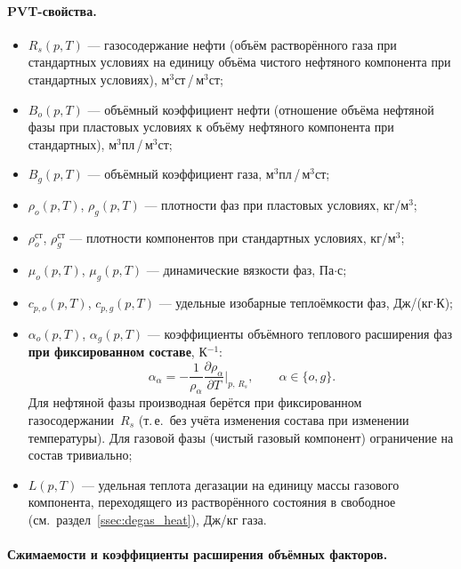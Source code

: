 \documentclass[12pt,a4paper]{article}
\begin{document}
\paragraph{PVT-свойства.}
\begin{itemize}[nosep]
  \item $R_s(p,T)$ --- газосодержание нефти (объём растворённого газа при
        стандартных условиях на единицу объёма чистого нефтяного компонента при стандартных условиях),
        м$^3$ст\,/\,м$^3$ст;
  \item $B_o(p,T)$ --- объёмный коэффициент нефти (отношение объёма
        нефтяной фазы при пластовых условиях к объёму нефтяного компонента
        при стандартных), м$^3$пл\,/\,м$^3$ст;
  \item $B_g(p,T)$ --- объёмный коэффициент газа, м$^3$пл\,/\,м$^3$ст;
  \item $\rho_o(p,T)$, $\rho_g(p,T)$ --- плотности фаз при пластовых
        условиях, кг/м$^3$;
  \item $\rho_o^{\text{ст}}$, $\rho_g^{\text{ст}}$ --- плотности
        компонентов при стандартных условиях, кг/м$^3$;
  \item $\mu_o(p,T)$, $\mu_g(p,T)$ --- динамические вязкости фаз, Па$\cdot$с;
  \item $c_{p,o}(p,T)$, $c_{p,g}(p,T)$ --- удельные изобарные теплоёмкости
        фаз, Дж/(кг$\cdot$К);
  \item $\alpha_o(p,T)$, $\alpha_g(p,T)$ --- коэффициенты объёмного
        теплового расширения фаз \textbf{при фиксированном составе},
        К$^{-1}$:
        \begin{equation}\label{eq:thermal_expansion}
          \alpha_\alpha = -\frac{1}{\rho_\alpha}
            \frac{\partial\rho_\alpha}{\partial T}\bigg|_{p,\,R_s},
            \qquad \alpha \in \{o, g\}.
        \end{equation}
        Для нефтяной фазы производная берётся при фиксированном
        газосодержании~$R_s$ (т.\,е.\ без учёта изменения состава при
        изменении температуры). Для газовой фазы (чистый газовый
        компонент) ограничение на состав тривиально;
  \item $L(p,T)$ --- удельная теплота дегазации на единицу массы
        газового компонента, переходящего из растворённого состояния
        в свободное (см.~раздел~\ref{ssec:degas_heat}), Дж/кг газа.
\end{itemize}

\paragraph{Сжимаемости и коэффициенты расширения объёмных факторов.}
\end{document}
